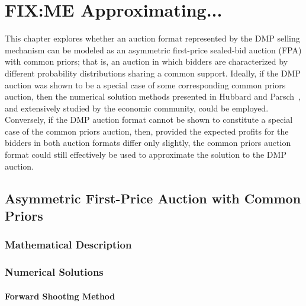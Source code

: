 \chapter{FIX:ME Approximating...}
\label{cha:approximation}

\minitoc
\vspace{10mm}

This chapter explores whether an auction format represented by the DMP selling mechanism can be modeled as an asymmetric first-price sealed-bid auction (FPA) with common priors; that is, an auction in which bidders are characterized by different probability distributions sharing a common support. Ideally, if the DMP auction was shown to be a special case of some corresponding common priors auction, then the numerical solution methods presented in Hubbard and Parsch~\cite{HubbardPaarsch2011}, and extensively studied by the economic community, could be employed. Conversely, if the DMP auction format cannot be shown to constitute a special case of the common priors auction, then, provided the expected profits for the bidders in both auction formats differ only slightly, the common priors auction format could still effectively be used to approximate the solution to the DMP auction.

\section{Asymmetric First-Price Auction with Common Priors} %
\label{sec:asymmetric_first_price_auction_with_common_priors}

\subsection{Mathematical Description} %
\label{sub:mathematical_description}


\subsection{Numerical Solutions} %
\label{sub:numerical_solutions}

\subsubsection{Forward Shooting Method} %
\label{ssub:forward_shooting_method}

